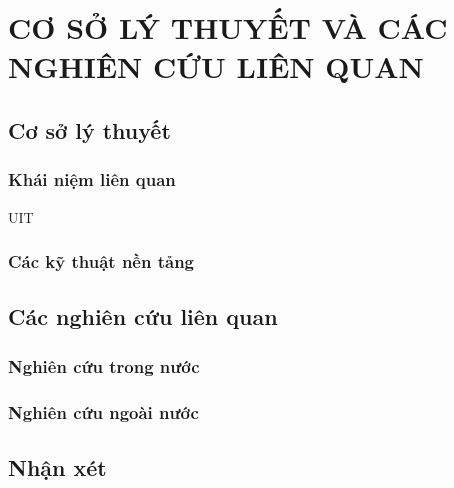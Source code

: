 \chapter{CƠ SỞ LÝ THUYẾT VÀ CÁC NGHIÊN CỨU LIÊN QUAN}
\label{chap:cosolythuyet}

\section{Cơ sở lý thuyết}
\subsection{Khái niệm liên quan}
\ac{UIT}
\subsection{Các kỹ thuật nền tảng}

\section{Các nghiên cứu liên quan}
\subsection{Nghiên cứu trong nước}
\subsection{Nghiên cứu ngoài nước}

\section{Nhận xét}
